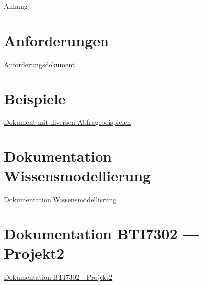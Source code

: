 \begin{titlepage}


    \clearpage
    \vspace*{\fill}
    \begin{center}
        \begin{minipage}{.6\textwidth}
            \fontsize{26pt}{28pt}\selectfont
            Anhang
        \end{minipage}
    \end{center}
    \vfill %
    \clearpage


\end{titlepage}

\newpage 


\appendix

\section*{Anforderungen}
\label{sec:anhang:anforderungen}
\href{anhang/anforderungen.pdf}{Anforderungsdokument}

\section*{Beispiele}
\label{sec:anhang:sparql_beispiele}
\href{anhang/schnipsel.pdf}{Dokument mit diversen Abfragebeispielen}

\section*{Dokumentation Wissensmodellierung}
\label{sec:anhang:tutorial_dokument}
\href{../Tutorial/template.pdf}{Dokumentation Wissensmodellierung}

\section*{Dokumentation BTI7302 --- Projekt2}
\label{sec:anhang:projekt2}
\href{../Extern/EigeneDokumente/DokumentationProjekt2.pdf}{Dokumentation BTI7302 - Projekt2}
